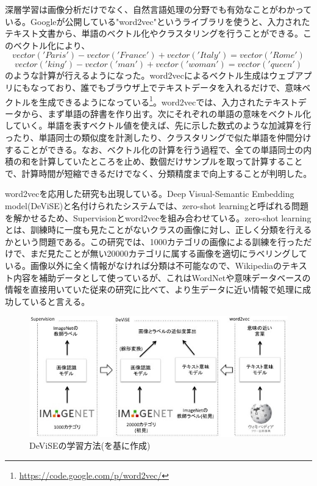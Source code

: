 深層学習は画像分析だけでなく、自然言語処理の分野でも有効なことがわかっている。Googleが公開している"word2vec"というライブラリを使うと、入力されたテキスト文書から、単語のベクトル化やクラスタリングを行うことができる\cite{mikolov2013efficient}\cite{mikolov2013linguistic}。このベクトル化により、
\begin{equation}
vector('Paris') - vector('France') + vector('Italy') = vector('Rome')
\end{equation}
\begin{equation}
vector('king') - vector('man') + vector('woman') = vector('queen')
\end{equation}
のような計算が行えるようになった。word2vecによるベクトル生成はウェブアプリにもなっており、誰でもブラウザ上でテキストデータを入れるだけで、意味ベクトルを生成できるようになっている\footnote{\url{https://code.google.com/p/word2vec/}}。word2vecでは、入力されたテキストデータから、まず単語の辞書を作り出す。次にそれぞれの単語の意味をベクトル化していく。単語を表すベクトル値を使えば、先に示した数式のような加減算を行ったり、単語同士の類似度を計測したり、クラスタリングで似た単語を仲間分けすることができる。なお、ベクトル化の計算を行う過程で、全ての単語同士の内積の和を計算していたところを止め、数個だけサンプルを取って計算することで、計算時間が短縮できるだけでなく、分類精度まで向上することが判明した\cite{mikolov2013distributed}。\par
word2vecを応用した研究も出現している。Deep Visual-Semantic Embedding model(DeViSE)\cite{frome2013devise:}と名付けられたシステムでは、zero-shot learningと呼ばれる問題を解かせるため、Supervisionとword2vecを組み合わせている。zero-shot learningとは、訓練時に一度も見たことがないクラスの画像に対し、正しく分類を行えるかという問題である。この研究では、1000カテゴリの画像による訓練を行っただけで、まだ見たことが無い20000カテゴリに属する画像を適切にラベリングしている。画像以外に全く情報がなければ分類は不可能なので、Wikipediaのテキスト内容を補助データとして使っているが、これはWordNetや意味データベースの情報を直接用いていた従来の研究\cite{mensink2012metric}\cite{rohrbach2011evaluating}\cite{palatucci2009zero-shot}に比べて、より生データに近い情報で処理に成功していると言える。\par
\begin{figure}[tbp]
 \centering
  \includegraphics[width=120mm]{img/c3/devise}
 \caption{DeViSEの学習方法(\cite{frome2013devise:}を基に作成)}
 \label{c3_devise}
\end{figure}

